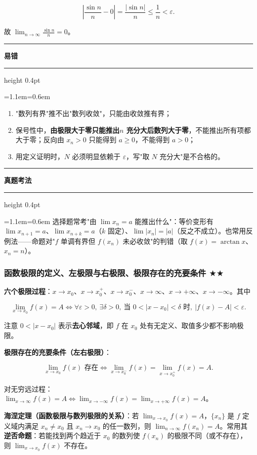 \documentclass[11pt,openany,UTF8]{ctexbook}
\newcommand{\callouthead}[2]{%
  \par\addvspace{7pt}\noindent
  {\color{#1}\rule[-0.15em]{3pt}{1.05em}}\hspace{0.5em}%
  {\bfseries\color{#1}#2}\par\nobreak\vspace{-0.35em}%
  {\color{rulesep}\hrule height 0.4pt}\nobreak\vspace{0.45em}%
  \begingroup\small\setlength{\parindent}{0pt}%
  \leftskip=1.1em\rightskip=0.6em\noindent\ignorespaces}
\newcommand{\calloutend}{\par\endgroup\addvspace{7pt}}
\newenvironment{callwarn}[1]{\callouthead{warnbar}{#1}}{\calloutend}
\newenvironment{callexam}[1]{\callouthead{exambar}{#1}}{\calloutend}
\begin{document}
\[\left\vert\frac{\sin n}{n}-0\right\vert=\frac{\vert\sin n\vert}{n}\le\frac1n<\varepsilon .\]

故 $\lim_{n\to\infty}\frac{\sin n}{n}=0$。

\begin{callwarn}{易错}
\begin{enumerate}
\item "数列有界"推不出"数列收敛"，只能由收敛推有界；
\item 保号性中，\textbf{由极限大于零只能推出$n$ 充分大后数列大于零}，不能推出所有项都大于零；反向由 $x_n>0$ 只能得到 $a\ge 0$，不能得到 $a>0$；
\item 用定义证明时，$N$ 必须明显依赖于 $\varepsilon$，写"取 $N$ 充分大"是不合格的。
\end{enumerate}
\end{callwarn}

\begin{callexam}{真题考法}
选择题常考"由 $\lim x_n=a$ 能推出什么"：等价变形有 $\lim x_{n+1}=a$、$\lim x_{n+k}=a$（$k$ 固定）、$\lim\vert x_n\vert=\vert a\vert$（反之不成立）。也常用反例法——命题对"$f$ 单调有界但 $f(x_n)$ 未必收敛"的判错（取 $f(x)=\arctan x$、$x_n=n$）。

\end{callexam}

\subsubsection{函数极限的定义、左极限与右极限、极限存在的充要条件 $\bigstar$$\bigstar$}

\textbf{六个极限过程}：$x\to x_0$、$x\to x_0^+$、$x\to x_0^-$、$x\to\infty$、$x\to+\infty$、$x\to-\infty$。其中

\[\lim_{x\to x_0}f(x)=A \iff \forall\varepsilon>0,\ \exists\delta>0,\ \text{当 } 0<\vert x-x_0\vert<\delta \text{ 时},\ \vert f(x)-A\vert<\varepsilon .\]

注意 $0<\vert x-x_0\vert$ 表示\textbf{去心邻域}，即 $f$ 在 $x_0$ 处有无定义、取值多少都不影响极限。

\textbf{极限存在的充要条件（左右极限）}：

\[\lim_{x\to x_0}f(x) \text{ 存在} \iff \lim_{x\to x_0^-}f(x)=\lim_{x\to x_0^+}f(x)=A .\]

对无穷远过程：$\lim_{x\to\infty}f(x)=A \iff \lim_{x\to-\infty}f(x)=\lim_{x\to+\infty}f(x)=A$。

\textbf{海涅定理（函数极限与数列极限的关系）}：若 $\lim_{x\to x_0}f(x)=A$，$\{x_n\}$ 是 $f$ 定义域内满足 $x_n\ne x_0$ 且 $x_n\to x_0$ 的任一数列，则 $\lim_{n\to\infty}f(x_n)=A$。常用其\textbf{逆否命题}：若能找到两个趋近于 $x_0$ 的数列使 $f(x_n)$ 的极限不同（或不存在），则 $\lim_{x\to x_0}f(x)$ 不存在。
\end{document}
